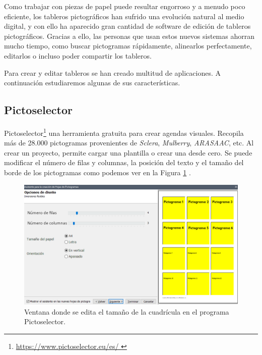 Como trabajar con piezas de papel puede resultar engorroso y a menudo poco eficiente, los tableros pictográficos han sufrido una evolución natural al medio digital, y con ello ha aparecido gran cantidad de software de edición de tableros pictográficos. Gracias a ello, las personas que usan estos nuevos sistemas ahorran mucho tiempo, como buscar pictogramas rápidamente, alinearlos perfectamente, editarlos o incluso poder compartir los tableros.


Para crear y editar tableros se han creado multitud de aplicaciones. A continuación estudiaremos algunas de sus características.



\subsection{Pictoselector}
Pictoselector\footnote{\url{ https://www.pictoselector.eu/es/ }} una herramienta gratuita para crear agendas visuales.  Recopila más de 28.000 pictogramas provenientes de \textit{Sclera}, \textit{Mulberry}, \textit{ARASAAC}, etc. Al crear un proyecto, permite cargar una plantilla o crear una desde cero. Se puede modificar el número de filas y columnas, la posición del texto y el tamaño del borde de los pictogramas como podemos ver en la Figura \ref{fig:pictoselector-tablero} .


\begin{figure}[h!]
	\centering
	\includegraphics[width=0.7\linewidth]{Imagenes/Bitmap/Pictoselector Tablero}
	\caption{Ventana donde se edita el tamaño de la cuadrícula en el programa Pictoselector.}
	\label{fig:pictoselector-tablero}
\end{figure}


